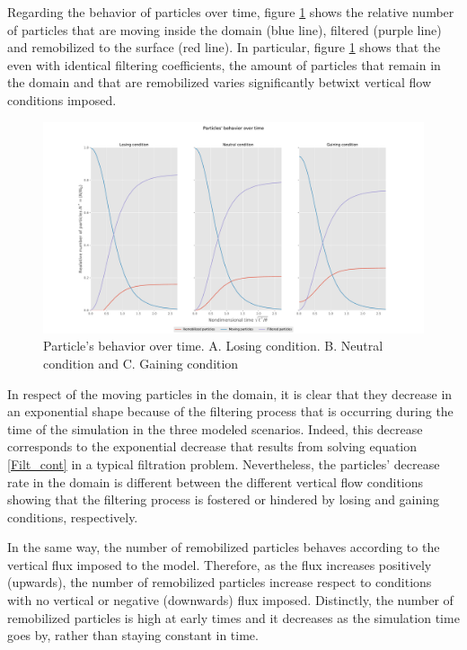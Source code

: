 \documentclass[draft,linenumbers]{agujournal2018}
\begin{document}
Regarding the behavior of particles over time, figure \ref{Pvst} shows the relative number of particles that are moving inside the domain (blue line), filtered (purple line) and remobilized to the surface (red line). In particular, figure \ref{Pvst} shows that the even with identical filtering coefficients, the amount of particles that remain in the domain and that are remobilized varies significantly betwixt vertical flow conditions imposed.

\begin{figure}[ht]
\centering
\includegraphics[trim=0.2cm 0.2cm 0.2cm 0.2cm, width=35pc]
{181203_Pvst.pdf}
\caption{Particle's behavior over time. A. Losing condition. B. Neutral condition and C. Gaining condition}
\label{Pvst}
\end{figure}

In respect of the moving particles in the domain, it is clear that they decrease in an exponential shape because of the filtering process that is occurring during the time of the simulation in the three modeled scenarios. Indeed, this decrease corresponds to the exponential decrease that results from solving equation \ref{Filt_cont} in a typical filtration problem. Nevertheless, the particles' decrease rate in the domain is different between the different vertical flow conditions showing that the filtering process is fostered or hindered by losing and gaining conditions, respectively. 

In the same way, the number of remobilized particles behaves according to the vertical flux imposed to the model. Therefore, as the flux increases positively (upwards), the number of remobilized particles increase respect to conditions with no vertical or negative (downwards) flux imposed. Distinctly, the number of remobilized particles is high at early times and it decreases as the simulation time goes by, rather than staying constant in time. 
\end{document}
